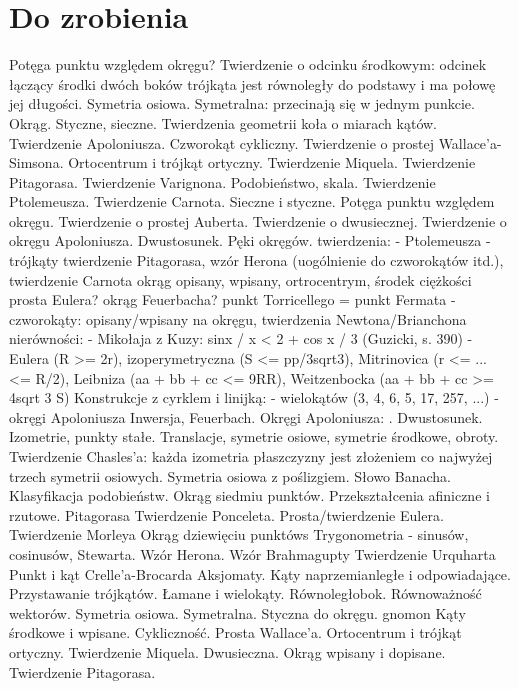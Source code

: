 
\section{Do zrobienia}
Potęga punktu względem okręgu?
Twierdzenie o odcinku środkowym: odcinek łączący środki dwóch boków trójkąta jest równoległy do podstawy i ma połowę jej długości.
Symetria osiowa.
Symetralna: przecinają się w jednym punkcie.
Okrąg.
Styczne, sieczne.
Twierdzenia geometrii koła o miarach kątów.
Twierdzenie Apoloniusza.
Czworokąt cykliczny.
Twierdzenie o prostej Wallace'a-Simsona.
Ortocentrum i trójkąt ortyczny.
Twierdzenie Miquela.
Twierdzenie Pitagorasa.
Twierdzenie Varignona.
Podobieństwo, skala.
Twierdzenie Ptolemeusza.
Twierdzenie Carnota.
Sieczne i styczne.
Potęga punktu względem okręgu.
Twierdzenie o prostej Auberta.
Twierdzenie o dwusiecznej.
Twierdzenie o okręgu Apoloniusza.
Dwustosunek.
Pęki okręgów.
twierdzenia:
- Ptolemeusza
- trójkąty
twierdzenie Pitagorasa, wzór Herona (uogólnienie do czworokątów itd.), twierdzenie Carnota
okrąg opisany, wpisany, ortrocentrym, środek ciężkości
prosta Eulera?
okrąg Feuerbacha?
punkt Torricellego = punkt Fermata
- czworokąty:
opisany/wpisany na okręgu, 
twierdzenia Newtona/Brianchona
nierówności:
- Mikołaja z Kuzy: sinx / x < 2 + cos x / 3 (Guzicki, s. 390)
- Eulera (R >= 2r), izoperymetryczna (S <= pp/3sqrt3), Mitrinovica (r <= ... <= R/2), Leibniza (aa + bb + cc <= 9RR), Weitzenbocka (aa + bb + cc >= 4sqrt 3 S)
Konstrukcje z cyrklem i linijką:
- wielokątów (3, 4, 6, 5, 17, 257, ...)
- okręgi Apoloniusza
Inwersja, Feuerbach.
Okręgi Apoloniusza: \cite[s. 444-461]{guzicki_2021}.
Dwustosunek.
Izometrie, punkty stałe.
Translacje, symetrie osiowe, symetrie środkowe, obroty.
Twierdzenie Chasles'a: każda izometria płaszczyzny jest złożeniem co najwyżej trzech symetrii osiowych.
Symetria osiowa z poślizgiem.
Słowo Banacha.
Klasyfikacja podobieństw.
Okrąg siedmiu punktów. %
Przekształcenia afiniczne i rzutowe.
Pitagorasa %
Twierdzenie Ponceleta.
Prosta/twierdzenie Eulera.
Twierdzenie Morleya
Okrąg dziewięciu punktóws
Trygonometria - sinusów, cosinusów, Stewarta.
Wzór Herona.
Wzór Brahmagupty
Twierdzenie Urquharta
Punkt i kąt Crelle'a-Brocarda
Aksjomaty. Kąty naprzemianległe i odpowiadające.
Przystawanie trójkątów.
Łamane i wielokąty.
Równoległobok.
Równoważność wektorów.
Symetria osiowa.
Symetralna.
Styczna do okręgu.
gnomon %
Kąty środkowe i wpisane.
Cykliczność. Prosta Wallace'a.
Ortocentrum i trójkąt ortyczny.
Twierdzenie Miquela.
Dwusieczna. Okrąg wpisany i dopisane.
Twierdzenie Pitagorasa.

